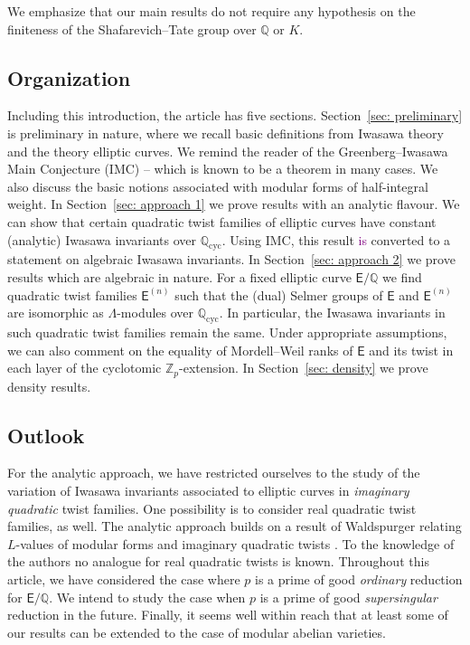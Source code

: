 \documentclass{amsart}
\newcommand{\DK}[1]{\textcolor{purple}{#1}}
\numberwithin{equation}{section}
\theoremstyle{remark}
\newcommand{\cyc}{\operatorname{cyc}}
\newcommand{\Zp}{\mathbb{Z}_p}
\newcommand{\Q}{\mathbb{Q}}
\newcommand{\EC}{\mathsf{E}}
\theoremstyle{plain} %
\begin{document}
We emphasize that our main results do not require any hypothesis on the finiteness of the Shafarevich--Tate group over $\Q$ or $K$.

\subsection{Organization}
Including this introduction, the article has five sections.
Section~\ref{sec: preliminary} is preliminary in nature, where we recall basic definitions from Iwasawa theory and the theory elliptic curves.
We remind the reader of the Greenberg--Iwasawa Main Conjecture (IMC) -- which is known to be a theorem in many cases.
We also discuss the basic notions associated with modular forms of half-integral weight.
In Section~\ref{sec: approach 1} we prove results with an analytic flavour.
We can show that certain quadratic twist families of elliptic curves have constant (analytic) Iwasawa invariants over $\Q_{\cyc}$.
Using IMC, this result \DK{is} converted to a statement on algebraic Iwasawa invariants.
In Section~\ref{sec: approach 2} we prove results which are algebraic in nature.
For a fixed elliptic curve $\EC/\Q$ we find quadratic twist families $\EC^{(n)}$ such that the (dual) Selmer groups of $\EC$ and $\EC^{(n)}$ are isomorphic as $\Lambda$-modules over $\Q_{\cyc}$.
In particular, the Iwasawa invariants in such quadratic twist families remain the same.
Under appropriate assumptions, we can also comment on the equality of Mordell--Weil ranks of $\EC$ and its twist in each layer of the cyclotomic $\Zp$-extension.
In Section~\ref{sec: density} we prove density results. %



\subsection{Outlook}
For the analytic approach, we have restricted ourselves to the study of the variation of Iwasawa invariants associated to elliptic curves in \emph{imaginary quadratic} twist families.
One possibility is to consider real quadratic twist families, as well.
The analytic approach builds on a result of Waldspurger relating $L$-values of modular forms and imaginary quadratic twists \cite{waldspurger}.
To the knowledge of the authors no analogue for real quadratic twists is known.
Throughout this article, we have considered the case where $p$ is a prime of good \emph{ordinary} reduction for $\EC/\Q$.
We intend to study the case when $p$ is a prime of good \emph{supersingular} reduction in the future.
Finally, it seems well within reach that at least some of our results can be extended to the case of modular abelian varieties.
\end{document}
